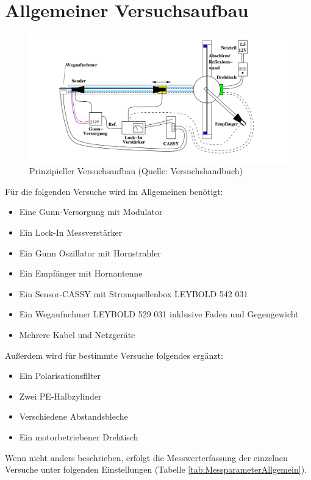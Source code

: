 \documentclass[12pt,a4paper]{article}
\begin{document}
\newpage

\section{Allgemeiner Versuchsaufbau}

\begin{figure}[H]
\centering
\includegraphics[scale=0.6]{Bilder/Versuchsaufbau.png}
\caption{Prinzipieller Versuchsaufbau (Quelle: Versuchshandbuch)}
\label{versuchsaufbau}
\end{figure}
Für die folgenden Versuche wird im Allgemeinen benötigt:
\begin{itemize}
\item 
Eine Gunn-Versorgung mit Modulator
\item
Ein Lock-In Messverstärker
\item
Ein Gunn Oszillator mit Hornstrahler
\item
Ein Empfänger mit Hornantenne
\item
Ein Sensor-CASSY mit Stromquellenbox LEYBOLD 542 031
\item
Ein Wegaufnehmer LEYBOLD 529 031 inklusive Faden und Gegengewicht
\item
Mehrere Kabel und Netzgeräte
\end{itemize}
Außerdem wird für bestimmte Versuche folgendes ergänzt:
\begin{itemize}
\item
Ein Polarisationsfilter
\item
Zwei PE-Halbzylinder
\item
Verschiedene Abstandsbleche
\item
Ein motorbetriebener Drehtisch
\end{itemize}
Wenn nicht anders beschrieben, erfolgt die Messwerterfassung der einzelnen Versuche unter folgenden Einstellungen (Tabelle \ref{tab:MessparameterAllgemein}).
\end{document}
